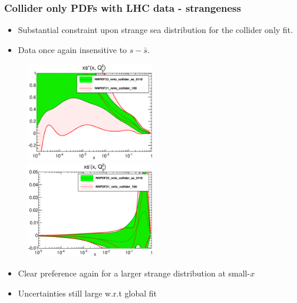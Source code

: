 \documentclass[10pt]{beamer}
\begin{document}
\begin{frame}
\frametitle{Collider only PDFs with LHC data - strangeness}

\begin{itemize}
\item<1-> Substantial constraint upon strange sea distribution for the collider only fit.
\item<1->  Data once again insensitive to $s-\bar{s}$.
\end{itemize}

 \begin{figure}[b!]
    \begin{center}
          \includegraphics[width=0.50\textwidth]{pdf_xsplus_log_band_comparison_coll.eps}
      \includegraphics[width=0.50\textwidth]{pdf_xsminus_log_band_comparison_coll.eps}
    \end{center}
    \vskip-0.5cm
    \label{fig:pdf-jets}
\end{figure}

\begin{itemize}
\item<1-> Clear preference again for a larger strange distribution at small-$x$
\item<1->  Uncertainties still large w.r.t global fit
\end{itemize}

\end{frame}
\end{document}
